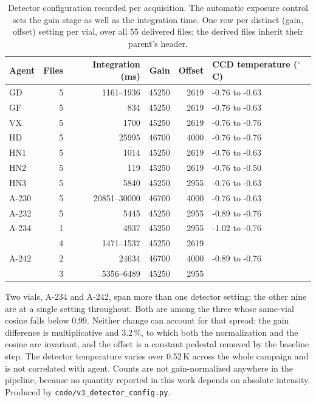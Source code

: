 \documentclass[11pt]{article}
\begin{document}
\begin{table}[htbp]
\centering
\caption{Detector configuration recorded per acquisition. The automatic exposure control sets the gain stage as well as the integration time. One row per distinct (gain, offset) setting per vial, over all 55 delivered files; the derived files inherit their parent's header.}
\label{tab:si-detconfig}
\small
\begin{tabular}{lrrrrl}
\toprule
Agent & Files & Integration (ms) & Gain & Offset & CCD temperature ($^{\circ}$C) \\
\midrule
GD & 5 & 1161--1936 & 45250 & 2619 & -0.76 to -0.63 \\
GF & 5 & 834 & 45250 & 2619 & -0.76 to -0.63 \\
VX & 5 & 1700 & 45250 & 2619 & -0.76 to -0.76 \\
HD & 5 & 25995 & 46700 & 4000 & -0.76 to -0.76 \\
HN1 & 5 & 1014 & 45250 & 2619 & -0.76 to -0.63 \\
HN2 & 5 & 119 & 45250 & 2619 & -0.76 to -0.50 \\
HN3 & 5 & 5840 & 45250 & 2955 & -0.76 to -0.63 \\
A-230 & 5 & 20851--30000 & 46700 & 4000 & -0.76 to -0.63 \\
A-232 & 5 & 5445 & 45250 & 2955 & -0.89 to -0.76 \\
A-234 & 1 & 4937 & 45250 & 2955 & -1.02 to -0.76 \\
 & 4 & 1471--1537 & 45250 & 2619 &  \\
A-242 & 2 & 24634 & 46700 & 4000 & -0.89 to -0.76 \\
 & 3 & 5356--6489 & 45250 & 2955 &  \\
\bottomrule
\end{tabular}

\begin{flushleft}\footnotesize Two vials, A-234 and A-242, span more than one detector setting; the other nine are at a single setting throughout. Both are among the three whose same-vial cosine falls below 0.99. Neither change can account for that spread: the gain difference is multiplicative and 3.2\,\%, to which both the normalization and the cosine are invariant, and the offset is a constant pedestal removed by the baseline step. The detector temperature varies over 0.52\,K across the whole campaign and is not correlated with agent. Counts are not gain-normalized anywhere in the pipeline, because no quantity reported in this work depends on absolute intensity. Produced by \texttt{code/v3\_detector\_config.py}.\end{flushleft}
\end{table}
\clearpage
\end{document}
